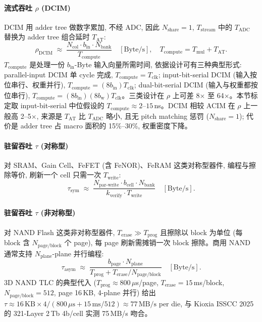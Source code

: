 \paragraph{流式吞吐 $\rho$ (DCIM)}
DCIM 用 adder tree 做数字累加, 不经 ADC, 因此 $N_{\mathrm{share}} = 1$, $T_{\mathrm{stream}}$ 中的 $T_{\mathrm{ADC}}$ 替换为 adder tree 组合延时 $T_{\mathrm{AT}}$:
\begin{equation}
\boxed{\ \rho_{\mathrm{DCIM}} \;\approx\; \frac{N_{\mathrm{col}} \cdot b_{\mathrm{in}} \cdot N_{\mathrm{bank}}}{T_{\mathrm{compute}}} \quad [\mathrm{Byte}/\mathrm{s}], \quad T_{\mathrm{compute}} = T_{\mathrm{mul}} + T_{\mathrm{AT}}.\ }
\label{eq:rho_dcim}
\end{equation}
$T_{\mathrm{compute}}$ 是处理一份 $b_{\mathrm{in}}$-Byte 输入向量所需时间, 依据设计可有三种典型形式: parallel-input DCIM 单 cycle 完成, $T_{\mathrm{compute}} = T_{\mathrm{clk}}$; input-bit-serial DCIM (输入按位串行、权重并行), $T_{\mathrm{compute}} = (8 b_{\mathrm{in}}) T_{\mathrm{clk}}$; dual-bit-serial DCIM (输入与权重都按位串行), $T_{\mathrm{compute}} = (8 b_{\mathrm{in}})(8 b_{\mathrm{w}}) T_{\mathrm{clk}}$。三类设计在 $\rho$ 上可差 8$\times$ 至 64$\times$。本节标定取 input-bit-serial 中位假设的 $T_{\mathrm{compute}} \approx 2$--$15$\,ns。DCIM 相较 ACIM 在 $\rho$ 上一般高 2--5$\times$, 来源是 $T_{\mathrm{AT}}$ 比 $T_{\mathrm{ADC}}$ 略小, 且无 pitch matching 惩罚 ($N_{\mathrm{share}} = 1$); 代价是 adder tree 占 macro 面积的 15\%--30\%, 权重密度下降。

\paragraph{驻留吞吐 $\tau$ (对称型)}
对 SRAM、Gain Cell、FeFET (含 FeNOR)、FeRAM 这类对称型器件, 编程与擦除等价, 刷新一个 cell 只需一次 $T_{\mathrm{write}}$:
\begin{equation}
\boxed{\ \tau_{\mathrm{sym}} \;\approx\; \frac{N_{\mathrm{par\text{-}write}} \cdot b_{\mathrm{cell}} \cdot N_{\mathrm{bank}}}{k_{\mathrm{verify}} \cdot T_{\mathrm{write}}} \quad [\mathrm{Byte}/\mathrm{s}].\ }
\label{eq:tau_sym}
\end{equation}

\paragraph{驻留吞吐 $\tau$ (非对称型)}
对 NAND Flash 这类非对称型器件, $T_{\mathrm{erase}} \gg T_{\mathrm{prog}}$ 且擦除以 block 为单位 (每 block 含 $N_{\mathrm{page/block}}$ 个 page), 每 page 刷新需摊销一次 block 擦除。商用 NAND 通常支持 $N_{\mathrm{plane}}$-plane 并行编程:
\begin{equation}
\boxed{\ \tau_{\mathrm{asym}} \;\approx\; \frac{b_{\mathrm{page}} \cdot N_{\mathrm{plane}}}{T_{\mathrm{prog}} + T_{\mathrm{erase}}/N_{\mathrm{page/block}}} \quad [\mathrm{Byte}/\mathrm{s}].\ }
\label{eq:tau_asym}
\end{equation}
3D NAND TLC 的典型代入 ($T_{\mathrm{prog}} \approx 800\,\mu$s/page, $T_{\mathrm{erase}} = 15$\,ms/block, $N_{\mathrm{page/block}} = 512$, page 16\,KB, 4-plane 并行) 给出 $\tau \approx 16\,\mathrm{KB} \times 4 / (800\,\mu\mathrm{s} + 15\,\mathrm{ms}/512) \approx 77\,\mathrm{MB/s}$ per die, 与 Kioxia ISSCC 2025 的 321-Layer 2\,Tb 4b/cell 实测 75\,MB/s 吻合。

